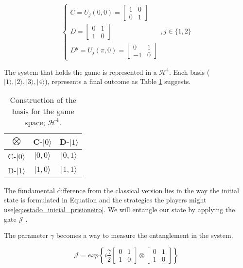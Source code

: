 \begin{equation}
\begin{cases}C= 
U_{j}(0, 0)=\left[\begin{array}{cc}
1 & 0\\
0 & 1
\end{array}\right]\\
D=\left[\begin{array}{cc}
0 & 1\\
1 & 0
\end{array}\right] \\
D^{y}= U_{j}(\pi, 0)=\left[\begin{array}{cc}
0 & 1\\
-1 & 0
\end{array}\right]
\end{cases} , j \in \{ 1, 2 \}
\label{eq:operators_prisioneiros_quanticosmiaurons}
\end{equation}

The system that holds the game is represented in a $\mathcal{H}^{4}$. Each basis ($\vert 1\rangle, \vert 2\rangle, \vert 3\rangle, \vert 4\rangle$), represents a final outcome as Table \ref{tab:prisioners_m} suggests.

\begin{table}
\begin{centering}
\begin{tabular}{ccc}
\hline 
$\bigotimes$ & C-$\vert 0\rangle$ & D-$\vert 1\rangle$\tabularnewline
\hline 
C-$\vert 0\rangle$ & $\vert 0,0\rangle$ & $\vert 0,1\rangle$\tabularnewline
D-$\vert 1\rangle$ & $\vert 1,0\rangle$ & $\vert 1,1\rangle$\tabularnewline
\hline 
\end{tabular}
\par\end{centering}

\caption{Construction of the basis for the game space; $\mathcal{H}^{4}$.}
\label{tab:prisioners_m}
\end{table}



The fundamental difference from the classical version lies in the way the initial state is formulated in Equation and the strategies the players might use\eqref{eq:estado_inicial_prisioneiro}. We will entangle our state by applying the gate $\mathcal{J}$ \cite{Letters2002}\cite{Eisert2008}. 

The parameter $\gamma$ becomes a way to measure the entanglement in the system\cite{Eisert2008}.

\begin{equation}
\label{eq:matrix_exponencial_esoterica}
\mathcal{J}=exp\left\{ i\frac{\gamma}{2}\left[\begin{array}{cc}
0 & 1\\
1 & 0
\end{array}\right]\otimes\left[\begin{array}{cc}
0 & 1\\
1 & 0
\end{array}\right]\right\}
\end{equation} 

